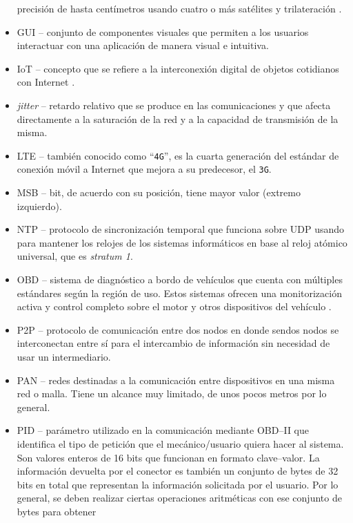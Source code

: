 \begin{itemize}
        precisión de hasta centímetros usando cuatro o más satélites y 
        trilateración \cite{GPS2021}.
  \item \ac{GUI} -- conjunto de componentes visuales que permiten a los usuarios
        interactuar con una aplicación de manera visual e intuitiva.
  \item \ac{IoT} -- concepto que se refiere a la interconexión digital de objetos 
        cotidianos con Internet \cite{InternetCosas2021}.
  \item \textit{jitter} -- retardo relativo que se produce en las comunicaciones
        y que afecta directamente a la saturación de la red y a la capacidad de
        transmisión de la misma.
  \item \ac{LTE} -- también conocido como ``\texttt{4G}'', es la cuarta generación
        del estándar de conexión móvil a Internet que mejora a su predecesor, el \texttt{3G}.
  \item \ac{MSB} -- bit, de acuerdo con su posición, tiene mayor valor (extremo izquierdo).
  \item \ac{NTP} -- protocolo de sincronización temporal que funciona sobre UDP usando para mantener
        los relojes de los sistemas informáticos en base al reloj atómico universal, que
        es \textit{stratum 1}.
  \item \ac{OBD} -- sistema de diagnóstico a bordo de vehículos que cuenta con múltiples estándares según la región de uso. Estos
        sistemas ofrecen una monitorización activa y control completo
        sobre el motor y otros dispositivos del vehículo \cite{OBD2021}.
  \item \ac{P2P} -- protocolo de comunicación entre dos nodos en donde sendos nodos se
        interconectan entre sí para el intercambio de información sin necesidad de usar
        un intermediario.
  \item \ac{PAN} -- redes destinadas a la comunicación entre dispositivos en una
        misma red o malla. Tiene un alcance muy limitado, de unos pocos metros por
        lo general.
  \item \ac{PID} -- parámetro utilizado en la comunicación mediante \ac{OBD}--II que
        identifica el tipo de petición que el mecánico/usuario quiera hacer al sistema.
        Son valores enteros de 16 bits que funcionan en formato clave--valor. La información
        devuelta por el conector es también un conjunto de bytes de 32 bits en total que
        representan la información solicitada por el usuario. Por lo general, se deben
        realizar ciertas operaciones aritméticas con ese conjunto de bytes para obtener

\end{itemize}
